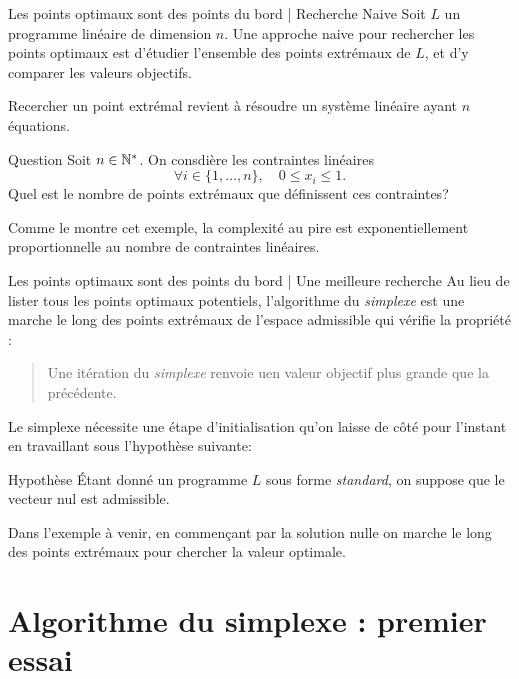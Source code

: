 \documentclass[aspectratio = 169]{beamer}
\begin{document}
\begin{frame}{Les points optimaux sont des points du bord | Recherche Naive}
  Soit $L$ un programme linéaire de dimension $n$. Une approche naive
  pour rechercher les points optimaux est d'étudier l'ensemble des
  points extrémaux de $L$, et d'y comparer les valeurs
  objectifs.
  \pause

  Recercher un point extrémal revient à résoudre un
  système linéaire ayant $n$ équations.
  \pause
  \begin{halfshyblock}{Question}
    Soit $n \in \mathbb{N}^*$. On consdière les contraintes linéaires
    \[
      \forall i \in \{1, \ldots, n\}, \quad 0 \leq x_i \leq 1.
    \]
    Quel est le nombre de points extrémaux que définissent ces
    contraintes?
  \end{halfshyblock}
  \pause Comme le montre cet exemple, la complexité au pire est
  exponentiellement proportionnelle au nombre de contraintes
  linéaires.
\end{frame}

\begin{frame}{Les points optimaux sont des points du bord | Une meilleure recherche}
  Au lieu de lister tous les points optimaux potentiels, l'algorithme
  du \emph{simplexe} est une marche le long des points extrémaux de
  l'espace admissible qui vérifie la propriété :
  \begin{quotation}
    Une itération du \emph{simplexe} renvoie uen valeur objectif plus
    grande que la précédente.
  \end{quotation}
  \pause Le simplexe nécessite une étape d'initialisation qu'on laisse
  de côté pour l'instant en travaillant sous l'hypothèse suivante:
  \begin{alertblock}{Hypothèse}
    Étant donné un programme $L$ sous forme \textit{standard}, on
    suppose que le vecteur nul est admissible.
  \end{alertblock}
  \pause Dans l'exemple à venir, en commen\c{c}ant par la solution
  nulle on marche le long des points extrémaux pour chercher la valeur
  optimale.
\end{frame}

\section{Algorithme du simplexe : premier essai}
\end{document}
